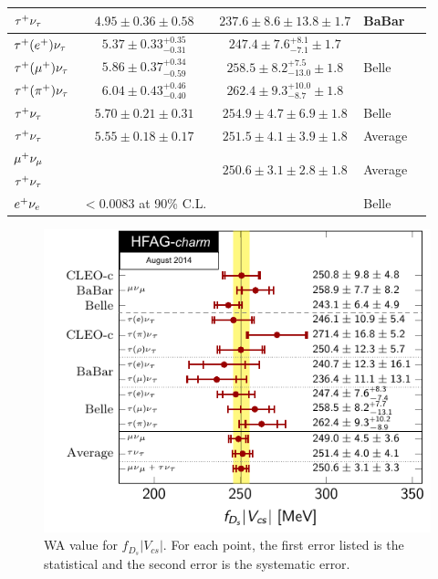 \begin{table}[t!]
\begin{center}
\begin{tabular}{lccll}
\midrule
\rowcolor{lightgray}
$\tau^+\nu_{\tau}$			& $4.95\pm0.36\pm0.58$		& $237.6 \pm 8.6 \pm 13.8 \pm 1.7$   & BaBar &\\
\midrule
$\tau^+(e^+)\nu_{\tau}$  			& $5.37\pm0.33^{+0.35}_{-0.31}$ & $247.4 \pm 7.6^{+8.1}_{-7.1} \pm 1.7$  & \multirow{3}{*}{Belle} & \multirow{3}{*}{\cite{Zupanc:2013byn}} \\
$\tau^+(\mu^+)\nu_{\tau}$ 		 	& $5.86\pm0.37^{+0.34}_{-0.59}$ & $258.5 \pm 8.2^{+7.5}_{-13.0} \pm 1.8$  & &\\ 
$\tau^+(\pi^+)\nu_{\tau}$  			& $6.04\pm0.43^{+0.46}_{-0.40}$ & $262.4 \pm 9.3^{+10.0}_{-8.7} \pm 1.8$  & &\\
\midrule
\rowcolor{lightgray}
$\tau^+\nu_{\tau}$			& $5.70\pm0.21\pm0.31$		& $254.9 \pm 4.7 \pm 6.9 \pm 1.8$   & Belle & \\
\midrule
\rowcolor{gray}
$\tau^+\nu_{\tau}$ 			& $5.55\pm0.18\pm0.17$ 		& $251.5 \pm 4.1 \pm 3.9 \pm 1.8$	& Average & \\
\midrule
\rowcolor{gray}
$\mu^+\nu_{\mu}$  			&		 		& \multirow{2}{*}{$250.6\pm 3.1\pm 2.8\pm1.8$}	& \multirow{2}{*}{Average} & \\
\rowcolor{gray}
$\tau^+\nu_{\tau}$ 			&		 		& \multirow{-2}{*}{$250.6\pm 3.1\pm 2.8\pm1.8$}	& \multirow{-2}{*}{Average} & \\
\midrule
$e^+\nu_{e}$				& $<0.0083$ at 90\% C.L.	& 					& Belle & \cite{Zupanc:2013byn} \\
\bottomrule
\end{tabular}
\end{center}
\end{table}
\begin{figure}[hbt!]
\centering
\includegraphics[width=1\textwidth]{figures/charm/fDsVcs.pdf}
\caption{
WA value for $f_{D_s}|V_{cs}|$. For each point, the first error listed is the statistical and the second error is the systematic error.
\label{fig:ExpDsLeptonic}
}
\end{figure}


